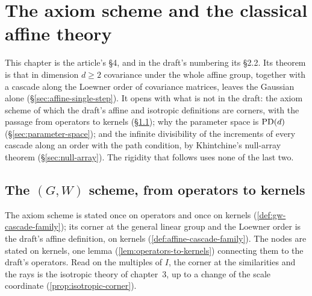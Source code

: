 %

\chapter{The axiom scheme and the classical affine theory}
\label{ch:classical}

This chapter is the article's \S 4, and in the draft's numbering its \S 2.2. Its theorem is that in
dimension $d \ge 2$ covariance under the whole affine group, together with a cascade along the
Loewner order of covariance matrices, leaves the Gaussian alone (\S\ref{sec:affine-single-step}).
It opens with what is not in the draft: the axiom scheme of which the draft's affine and isotropic
definitions are corners, with the passage from operators to kernels (\S\ref{sec:affine-covariance});
why the parameter space is $\mathrm{PD}(d)$ (\S\ref{sec:parameter-space}); and the infinite divisibility of
the increments of every cascade along an order with the path condition, by Khintchine's null-array
theorem (\S\ref{sec:null-array}). The rigidity that follows uses none of the last two.

\section{The $(G, W)$ scheme, from operators to kernels}
\label{sec:affine-covariance}

The axiom scheme is stated once on operators and once on kernels (\ref{def:gw-cascade-family}); its
corner at the general linear group and the Loewner order is the draft's affine definition, on kernels
(\ref{def:affine-cascade-family}). The nodes are stated on kernels, one lemma
(\ref{lem:operators-to-kernels}) connecting them to the draft's operators. Read on the multiples of
$I$, the corner at the similarities and the rays is the isotropic theory of chapter~3, up to a change
of the scale coordinate (\ref{prop:isotropic-corner}).

